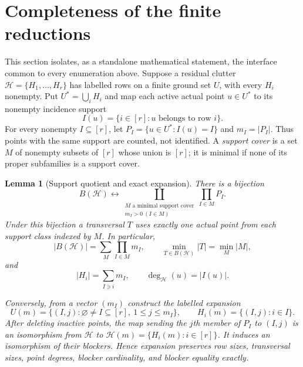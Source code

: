 \documentclass[11pt,a4paper]{article}
\newtheorem{lemma}[theorem]{Lemma}
\theoremstyle{definition}
\newcommand{\blocker}{B}
\begin{document}
\section{Completeness of the finite reductions}
\label{sec:finite-interface}

This section isolates, as a standalone mathematical statement, the interface
common to every enumeration above.  Suppose a residual clutter
$\mathcal H=\{H_1,\ldots,H_r\}$ has labelled rows on a finite ground set
$U$, with every $H_i$ nonempty.  Put $U^*=\bigcup_iH_i$ and map each active
actual point $u\in U^*$ to its nonempty incidence support
\[
 I(u)=\{i\in[r]:u\text{ belongs to row }i\}.                \tag{S10.1}
\]
For every nonempty $I\subseteq[r]$, let
$P_I=\{u\in U^*:I(u)=I\}$ and $m_I=|P_I|$.  Thus points with the same support
are counted, not identified.  A \emph{support cover} is a set $M$ of
nonempty subsets of $[r]$ whose union is $[r]$; it is minimal if none of its
proper subfamilies is a support cover.

\begin{lemma}[Support quotient and exact expansion]
\label{lem:support-quotient}
There is a bijection
\[
 \blocker(\mathcal H)
 \longleftrightarrow
 \coprod_{\substack{M\text{ a minimal support cover}\\m_I>0\ (I\in M)}}
 \prod_{I\in M}P_I.                                      \tag{S10.2}
\]
Under this bijection a transversal $T$ uses exactly one actual point from
each support class indexed by $M$.  In particular,
\[
 |\blocker(\mathcal H)|
   =\sum_M\prod_{I\in M}m_I,
 \qquad
 \min_{T\in\blocker(\mathcal H)}|T|=\min_M|M|,           \tag{S10.3}
\]
and
\[
 |H_i|=\sum_{I\ni i}m_I,
 \qquad
 \deg_{\mathcal H}(u)=|I(u)|.                            \tag{S10.4}
\]

Conversely, from a vector $(m_I)$ construct the labelled expansion
\[
 U(m)=\{(I,j):\varnothing\ne I\subseteq[r],\ 1\leq j\leq m_I\},
 \qquad
 H_i(m)=\{(I,j):i\in I\}.                                \tag{S10.5}
\]
After deleting inactive points, the map sending the $j$th member of $P_I$
to $(I,j)$ is an isomorphism from $\mathcal H$ to
$\mathcal H(m)=\{H_i(m):i\in[r]\}$.  It induces an isomorphism of their
blockers.  Hence expansion preserves row sizes, transversal sizes, point
degrees, blocker cardinality, and blocker equality exactly.
\end{lemma}
\end{document}
